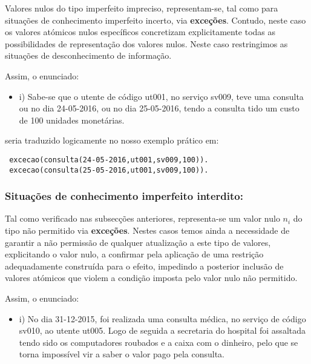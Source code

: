 \documentclass[
  oneside,
  10pt, a4paper,
  footinclude=true,
  headinclude=true,
  cleardoublepage=empty
]{scrbook}
\begin{document}
        
        
Valores nulos do tipo imperfeito impreciso, representam-se, tal como para situações de conhecimento imperfeito incerto, via \textbf{exceções}. Contudo, neste caso os valores atómicos nulos específicos concretizam explicitamente todas as possibilidades de representação dos valores nulos. Neste caso restringimos as situações de desconhecimento de informação.\par 


Assim, o enunciado: 
\begin{itemize}
\item i) Sabe-se que o utente de código ut001, no serviço sv009, teve uma consulta ou no dia 24-05-2016, ou no dia 25-05-2016, tendo a consulta tido um custo de 100 unidades monetárias.
\end{itemize}

seria traduzido logicamente  no nosso exemplo prático em:
\begin{lstlisting}
 excecao(consulta(24-05-2016,ut001,sv009,100)).
 excecao(consulta(25-05-2016,ut001,sv009,100)).
\end{lstlisting}

\subsubsection{\textbf{Situações de conhecimento imperfeito interdito:}}

Tal como verificado nas subsecções anteriores, representa-se um valor nulo $n_{i}$ do tipo não permitido via \textbf{exceções}. Nestes casos temos ainda a necessidade de garantir a não permissão de qualquer atualização a este tipo de valores, explicitando o valor nulo,
a confirmar pela aplicação de uma restrição adequadamente construída para o efeito, impedindo a posterior inclusão de valores atómicos que violem a condição imposta pelo valor nulo não permitido.

Assim, o enunciado: 
\begin{itemize}
\item i) No dia 31-12-2015, foi realizada uma consulta médica, no serviço de código sv010, ao utente ut005. Logo de seguida a secretaria do hospital foi assaltada tendo sido os computadores roubados e a caixa com o dinheiro, pelo que se torna impossível vir a saber o valor pago pela consulta.
\end{itemize}
\end{document}
